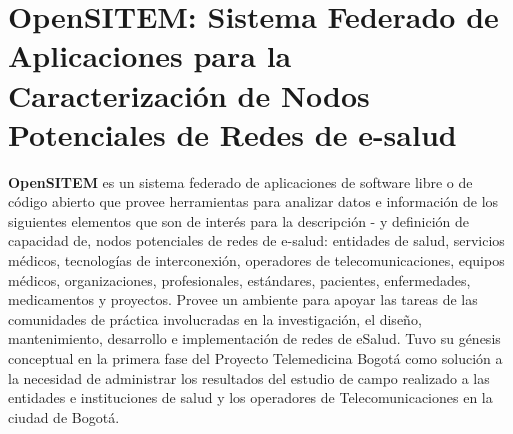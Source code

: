 \chapter{OpenSITEM: Sistema Federado de Aplicaciones para la Caracterización de Nodos Potenciales de Redes de e-salud}

\textbf{OpenSITEM }es un sistema federado de aplicaciones de software libre o de código abierto que provee herramientas para analizar datos e información de los siguientes elementos que son de interés para la descripción - y definición de capacidad de, nodos potenciales de redes de e-salud: entidades de salud, servicios médicos, tecnologías de interconexión, operadores de telecomunicaciones, equipos médicos, organizaciones, profesionales, estándares, pacientes, enfermedades, medicamentos y proyectos. Provee un ambiente para apoyar las tareas de las comunidades de práctica involucradas en la investigación, el diseño, mantenimiento, desarrollo e implementación de redes de eSalud. Tuvo su génesis conceptual en la primera fase del Proyecto Telemedicina Bogotá como solución a la necesidad de administrar los resultados del estudio de campo realizado a las entidades e instituciones de salud y los operadores de Telecomunicaciones en la ciudad de Bogotá.

